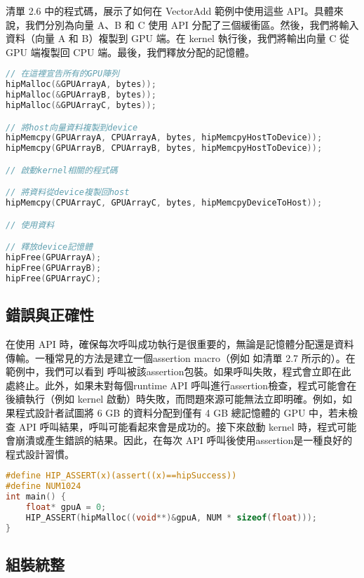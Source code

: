 清單 2.6 中的程式碼，展示了如何在 VectorAdd 範例中使用這些  API。具體來說，我們分別為向量 A、B 和 C 使用  API 分配了三個緩衝區。然後，我們將輸入資料（向量 A 和 B）複製到 GPU 端。在 kernel 執行後，我們將輸出向量 C 從 GPU 端複製回 CPU 端。最後，我們釋放分配的記憶體。

\begin{lstlisting}[language=C, caption={VectorAdd 範例中的 GPU 資料管理}, label={6th:example}]
// 在這裡宣告所有的GPU陣列
hipMalloc(&GPUArrayA, bytes));
hipMalloc(&GPUArrayB, bytes));
hipMalloc(&GPUArrayC, bytes));

// 將host向量資料複製到device
hipMemcpy(GPUArrayA, CPUArrayA, bytes, hipMemcpyHostToDevice));
hipMemcpy(GPUArrayB, CPUArrayB, bytes, hipMemcpyHostToDevice));

// 啟動kernel相關的程式碼

// 將資料從device複製回host
hipMemcpy(CPUArrayC, GPUArrayC, bytes, hipMemcpyDeviceToHost));

// 使用資料

// 釋放device記憶體
hipFree(GPUArrayA);
hipFree(GPUArrayB);
hipFree(GPUArrayC);
\end{lstlisting}

\subsection{錯誤與正確性}
在使用  API 時，確保每次呼叫成功執行是很重要的，無論是記憶體分配還是資料傳輸。一種常見的方法是建立一個assertion macro（例如 如清單 2.7 所示的）。在範例中，我們可以看到  呼叫被該assertion包裝。如果呼叫失敗，程式會立即在此處終止。此外，如果未對每個runtime API 呼叫進行assertion檢查，程式可能會在後續執行（例如 kernel 啟動）時失敗，而問題來源可能無法立即明確。例如，如果程式設計者試圖將 6 GB 的資料分配到僅有 4 GB 總記憶體的 GPU 中，若未檢查 API 呼叫結果，呼叫可能看起來會是成功的。接下來啟動 kernel 時，程式可能會崩潰或產生錯誤的結果。因此，在每次 API 呼叫後使用assertion是一種良好的程式設計習慣。

\begin{lstlisting}[language=C, caption={\term{HIP} 錯誤檢查範例}, label={7th:example}]
#define HIP_ASSERT(x)(assert((x)==hipSuccess))
#define NUM1024
int main() {
    float* gpuA = 0;
    HIP_ASSERT(hipMalloc((void**)&gpuA, NUM * sizeof(float)));
}
\end{lstlisting}

\subsection{組裝統整}


